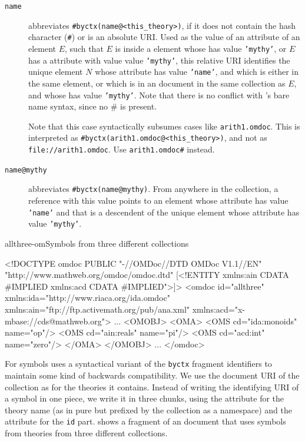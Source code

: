 \begin{description}
\item[{\tt{name}}] abbreviates {\tt{\#byctx(name@<this\_theory>)}}, if it does not
  contain the hash character ({\tt{\#}}) or is an absolute URI. Used as the value
  of an attribute of an element $E$, such that $E$ is inside a {}
  element whose {} has value {\tt{'mythy'}}, or $E$ has a
  {} attribute with value value {\tt{'mythy'}}, this relative
  URI identifies the unique element $N$ whose {} attribute has
  value {\tt{'name'}}, and which is either in the same {} element,
  or which is in an {\omdoc} document in the same collection as $E$, and whose
  {} has value {\tt{'mythy'}}. Note that there is no conflict
  with {\xpointer}'s bare name syntax, since no {\#} is present.
  
  Note that this case syntactically subsumes cases like {\tt{arith1.omdoc}}. This
  is interpreted as {\tt{\#byctx(arith1.omdoc@<this\_theory>)}}, and not as
  {\tt{file://arith1.omdoc}}. Use {\tt{arith1.omdoc\#}} instead.

\item[{\tt{name@mythy}}] abbreviates {\tt{\#byctx(name@mythy)}}. From anywhere in
  the collection, a reference with this value points to an element whose
  {} attribute has value {\tt{'name'}} and that is a descendent
  of the unique {} element whose {}
  attribute has value {\tt{'mythy'}}.
\end{description}
\begin{myfig}{allthree-om}{Symbols from three different collections}\footnotesize
 \begin{boxedverbatim}
<!DOCTYPE omdoc PUBLIC "-//OMDoc//DTD OMDoc V1.1//EN" 
                       "http://www.mathweb.org/omdoc/omdoc.dtd" 
  [<!ENTITY %
                         xmlns:ain CDATA #IMPLIED
                         xmlns:acd CDATA #IMPLIED">]>
<omdoc id="allthree"
  xmlns:ida="http://www.riaca.org/ida.omdoc"
  xmlns:ain="ftp://ftp.activemath.org/pub/ana.xml"
  xmlns:acd="x-mbase://cds@mathweb.org">
 ...
 <OMOBJ>
  <OMA>
   <OMS cd="ida:monoids" name="op"/>
   <OMS cd="ain:reals" name="pi"/>
   <OMS cd="acd:int" name="zero"/>
  </OMA>
 </OMOBJ>
 ...
</omdoc>
\end{boxedverbatim}
\end{myfig}
For {\openmath} symbols {\omdoc} uses a syntactical variant of the {\tt{byctx}}
fragment identifiers to maintain some kind of backwards compatibility. We use the
document URI of the collection as {} for the theories it
contains. Instead of writing the identifying URI of a symbol in one piece, we
write it in three chunks, using the {} attribute for the theory
name (as in pure {\openmath} but prefixed by the collection as a namespace) and
the {} attribute for the {\tt{id}} part.
{} shows a fragment of an {\omdoc} document that uses
symbols from theories from three different collections. 

